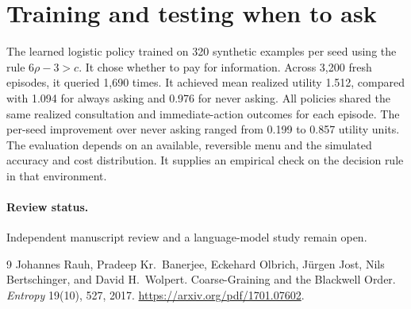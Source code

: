 \documentclass[11pt]{article}
\begin{document}
\section{Training and testing when to ask}
The learned logistic policy trained on 320 synthetic examples per
seed using the rule \(6\rho-3>c\). It chose whether to pay for
information. Across 3,200 fresh episodes, it queried 1,690 times.
It achieved mean realized utility 1.512, compared with 1.094 for
always asking and 0.976 for never asking. All policies shared
the same realized consultation and immediate-action outcomes
for each episode. The per-seed improvement over never asking
ranged from 0.199 to 0.857 utility units. The evaluation depends
on an available, reversible menu and the simulated accuracy
and cost distribution. It supplies an empirical check on the
decision rule in that environment.

\paragraph{Review status.} Independent manuscript review and a language-model study remain open.

\begin{thebibliography}{9}
 Johannes Rauh, Pradeep Kr.~Banerjee, Eckehard
Olbrich, J\"urgen Jost, Nils Bertschinger, and David H.~Wolpert.
Coarse-Graining and the Blackwell Order. \emph{Entropy}
19(10), 527, 2017. \url{https://arxiv.org/pdf/1701.07602}.
\end{thebibliography}
\end{document}
